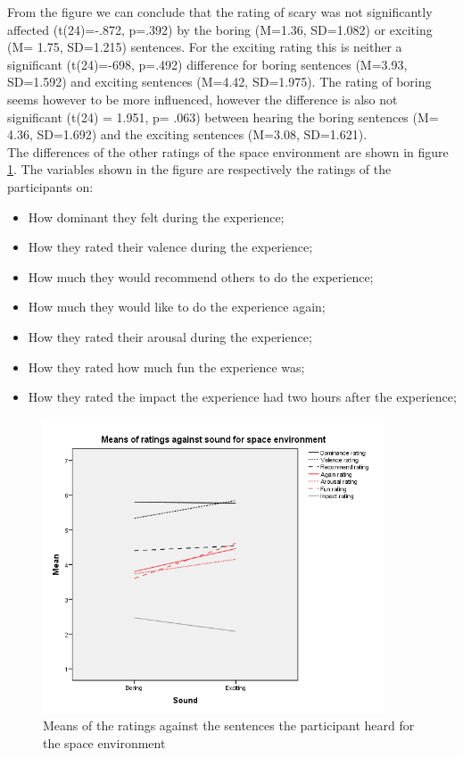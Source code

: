 \documentclass[Results.tex]{subfiles}
\begin{document}
From the figure we can conclude that the rating of scary was not significantly affected (t(24)=-.872, p=.392) by the boring (M=1.36, SD=1.082) or exciting (M= 1.75, SD=1.215) sentences. For the exciting rating this is neither a significant (t(24)=-698, p=.492) difference for boring sentences (M=3.93, SD=1.592) and exciting sentences (M=4.42, SD=1.975). The rating of boring seems however to be more influenced, however the difference is also not significant (t(24) = 1.951, p= .063) between hearing the boring sentences (M= 4.36, SD=1.692) and the exciting sentences (M=3.08, SD=1.621). \\

The differences of the other ratings of the space environment are shown in figure \ref{fig:Ratings2_sound_BM}. The variables shown in the figure are respectively the ratings of the participants on:
\begin{itemize}
\item How dominant they felt during the experience;
\item How they rated their valence during the experience;
\item How much they would recommend others to do the experience;
\item How much they would like to do the experience again;
\item How they rated their arousal during the experience;
\item How they rated how much fun the experience was;
\item How they rated the impact the experience had two hours after the experience;
\end{itemize}

\begin{figure}[H]
	\centering
		\includegraphics[width=0.90\textwidth]{Section_1/Figures/Ratings2_sound_BM.png}
	\caption{Means of the ratings against the sentences the participant heard for the space environment}
	\label{fig:Ratings2_sound_BM}
\end{figure}
\end{document}
